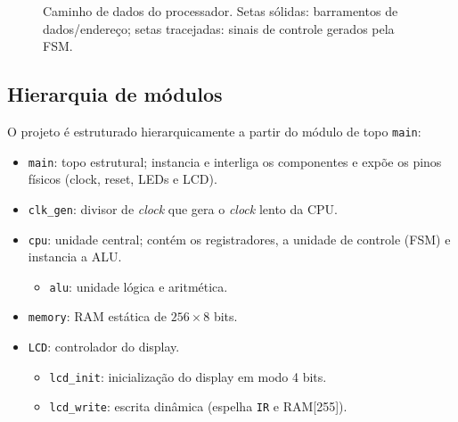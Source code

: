 \documentclass[12pt,a4paper]{article}
\begin{document}
\begin{figure}[H]
    \caption{Caminho de dados do processador. Setas sólidas: barramentos de dados/endereço;
             setas tracejadas: sinais de controle gerados pela FSM.}
    \label{fig:datapath}
\end{figure}

\subsection{Hierarquia de módulos}

O projeto é estruturado hierarquicamente a partir do módulo de topo \texttt{main}:

\begin{itemize}
    \item \texttt{main}: topo estrutural; instancia e interliga os componentes e expõe
          os pinos físicos (clock, reset, LEDs e LCD).
    \item \texttt{clk\_gen}: divisor de \textit{clock} que gera o \textit{clock} lento
          da CPU.
    \item \texttt{cpu}: unidade central; contém os registradores, a unidade de controle
          (FSM) e instancia a ALU.
    \begin{itemize}
        \item \texttt{alu}: unidade lógica e aritmética.
    \end{itemize}
    \item \texttt{memory}: RAM estática de $256 \times 8$ bits.
    \item \texttt{LCD}: controlador do display.
    \begin{itemize}
        \item \texttt{lcd\_init}: inicialização do display em modo 4 bits.
        \item \texttt{lcd\_write}: escrita dinâmica (espelha \texttt{IR} e RAM[255]).
    \end{itemize}
\end{itemize}
\end{document}

